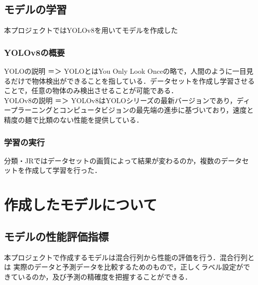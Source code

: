 \begin{multicols*}{2}


\subsection{モデルの学習}
本プロジェクトではYOLOv8を用いてモデルを作成した
\subsubsection{YOLOv8の概要}
YOLOの説明 ＝＞
YOLOとはYou Only Look Onceの略で，人間のように一目見るだけで物体検出ができることを指している．データセットを作成し学習させることで，任意の物体のみ検出させることが可能である．\\
YOLOv8の説明  ＝＞ 
YOLOv8はYOLOシリーズの最新バージョンであり，ディープラーニングとコンピュータビジョンの最先端の進歩に基づいており，速度と精度の麺で比類のない性能を提供している．


\subsubsection{学習の実行}
分類・JRではデータセットの画質によって結果が変わるのか，複数のデータセットを作成して学習を行った．\\

\section{作成したモデルについて}
\subsection{モデルの性能評価指標}
本プロジェクトで作成するモデルは混合行列から性能の評価を行う．混合行列とは
	実際のデータと予測データを比較するためのもので，正しくラベル設定ができているのか，及び予測の精確度を把握することができる．

\end{multicols*}
